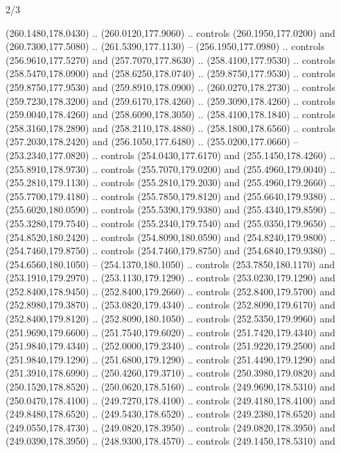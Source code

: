 \begin{flagdescription}{2/3}
\begin{scope}[xshift=0.5\flaglength,yshift=0.5\flagwidth,scale=\flagwidth/259.2]
\begin{scope}[y=0.8pt, x=0.8pt, yscale=-1,shift={(-243,-162)}]
      (260.1480,178.0430) .. (260.0120,177.9060) .. controls (260.1950,177.0200) and
      (260.7300,177.5080) .. (261.5390,177.1130) -- (256.1950,177.0980) .. controls
      (256.9610,177.5270) and (257.7070,177.8630) .. (258.4100,177.9530) .. controls
      (258.5470,178.0900) and (258.6250,178.0740) .. (259.8750,177.9530) .. controls
      (259.8750,177.9530) and (259.8910,178.0900) .. (260.0270,178.2730) .. controls
      (259.7230,178.3200) and (259.6170,178.4260) .. (259.3090,178.4260) .. controls
      (259.0040,178.4260) and (258.6090,178.3050) .. (258.4100,178.1840) .. controls
      (258.3160,178.2890) and (258.2110,178.4880) .. (258.1800,178.6560) .. controls
      (257.2030,178.2420) and (256.1050,177.6480) .. (255.0200,177.0660) --
      (253.2340,177.0820) .. controls (254.0430,177.6170) and (255.1450,178.4260) ..
      (255.8910,178.9730) .. controls (255.7070,179.0200) and (255.4960,179.0040) ..
      (255.2810,179.1130) .. controls (255.2810,179.2030) and (255.4960,179.2660) ..
      (255.7700,179.4180) .. controls (255.7850,179.8120) and (255.6640,179.9380) ..
      (255.6020,180.0590) .. controls (255.5390,179.9380) and (255.4340,179.8590) ..
      (255.3280,179.7540) .. controls (255.2340,179.7540) and (255.0350,179.9650) ..
      (254.8520,180.2420) .. controls (254.8090,180.0590) and (254.8240,179.9800) ..
      (254.7460,179.8750) .. controls (254.7460,179.8750) and (254.6840,179.9380) ..
      (254.6560,180.1050) -- (254.1370,180.1050) .. controls (253.7850,180.1170) and
      (253.1910,179.2970) .. (253.1130,179.1290) .. controls (253.0230,179.1290) and
      (252.8400,178.9450) .. (252.8400,179.2660) .. controls (252.8400,179.5700) and
      (252.8980,179.3870) .. (253.0820,179.4340) .. controls (252.8090,179.6170) and
      (252.8400,179.8120) .. (252.8090,180.1050) .. controls (252.5350,179.9960) and
      (251.9690,179.6600) .. (251.7540,179.6020) .. controls (251.7420,179.4340) and
      (251.9840,179.4340) .. (252.0000,179.2340) .. controls (251.9220,179.2500) and
      (251.9840,179.1290) .. (251.6800,179.1290) .. controls (251.4490,179.1290) and
      (251.3910,178.6990) .. (250.4260,179.3710) .. controls (250.3980,179.0820) and
      (250.1520,178.8520) .. (250.0620,178.5160) .. controls (249.9690,178.5310) and
      (250.0470,178.4100) .. (249.7270,178.4100) .. controls (249.4180,178.4100) and
      (249.8480,178.6520) .. (249.5430,178.6520) .. controls (249.2380,178.6520) and
      (249.0550,178.4730) .. (249.0820,178.3950) .. controls (249.0820,178.3950) and
      (249.0390,178.3950) .. (248.9300,178.4570) .. controls (249.1450,178.5310) and

\end{scope}
\end{scope}
\end{flagdescription}
